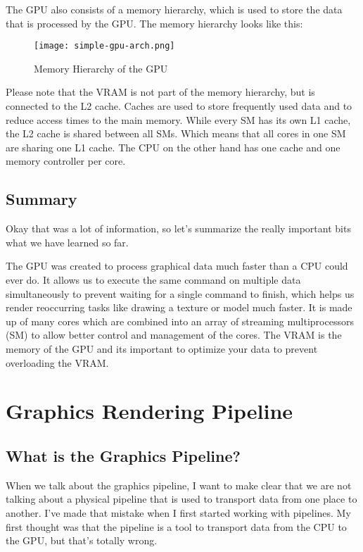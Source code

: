 \documentclass[12pt]{report} \usepackage{preamble}
\begin{document}
The GPU also consists of a memory hierarchy, which is used to store the
data that is processed by the GPU. The memory hierarchy looks like this:

\begin{figure}[hbtp]
	\centering
	\texttt{[image: simple-gpu-arch.png]}
	\caption{Memory Hierarchy of the GPU \cite{fig:gpu-arch}}
\end{figure}

Please note that the VRAM is not part of the memory hierarchy, but is
connected to the L2 cache. Caches are used to store frequently used
data and to reduce access times to the main memory. While every SM
has its own L1 cache, the L2 cache is shared between all SMs. Which
means that all cores in one SM are sharing one L1 cache. The CPU
on the other hand has one cache and one memory controller per
core. \cite{CUDA_Programming_Guide}

\section {Summary}

Okay that was a lot of information, so let's summarize the really
important bits what we have learned so far.

The GPU was created to process graphical data much faster than a CPU
could ever do. It allows us to execute the same command on multiple
data simultaneously to prevent waiting for a single command to finish,
which helps us render reoccurring tasks like drawing a texture or model
much faster.  It is made up of many cores which are combined into an
array of streaming multiprocessors (SM) to allow better control and
management of the cores.  The VRAM is the memory of the GPU and its
important to optimize your data to prevent overloading the VRAM.

\chapter{Graphics Rendering Pipeline}

\section{What is the Graphics Pipeline?}

When we talk about the graphics pipeline, I want to make clear that we
are not talking about a physical pipeline that is used to transport data
from one place to another. I've made that mistake when I first started
working with pipelines. My first thought was that the pipeline is a tool
to transport data from the CPU to the GPU, but that's totally wrong.
\end{document}
